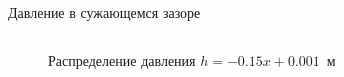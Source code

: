 \documentclass[ignoreonframetext,unicode]{beamer}
\begin{document}
\begin{frame}{Давление в сужающемся зазоре}	
	\begin{columns}
		\begin{figure}[!htbp]
		\caption{Распределение давления $h = -0.15 x + 0.001$~м}
		\label{res_static}
	\end{figure}
	

\end{columns}
\end{frame}
\end{document}
